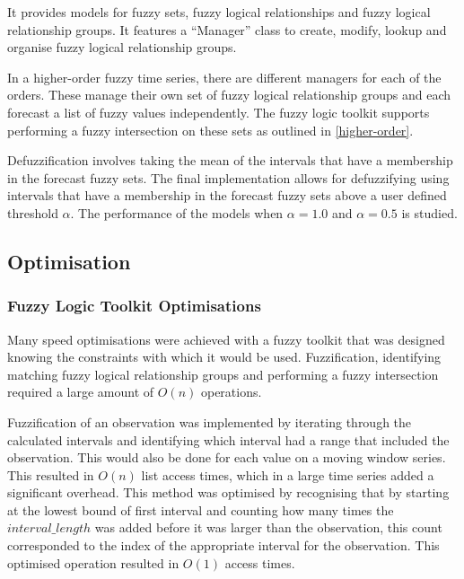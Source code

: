 \documentclass[12pt]{article}
\theoremstyle{definition}
\begin{document}
It provides models for fuzzy sets, fuzzy logical relationships and fuzzy logical relationship groups. It features a ``Manager'' class to create, modify, lookup and organise fuzzy logical relationship groups.

In a higher-order fuzzy time series, there are different managers for each of the orders. These manage their own set of fuzzy logical relationship groups and each forecast a list of fuzzy values independently. The fuzzy logic toolkit supports performing a fuzzy intersection on these sets as outlined in \cref{higher-order}.

Defuzzification involves taking the mean of the intervals that have a membership in the forecast fuzzy sets. The final implementation allows for defuzzifying using intervals that have a membership in the forecast fuzzy sets above a user defined threshold $\alpha$. The performance of the models when $\alpha = 1.0$ and $\alpha = 0.5$ is studied.

\subsection{Optimisation}

\label{optimisations}

\subsubsection{Fuzzy Logic Toolkit Optimisations}

Many speed optimisations were achieved with a fuzzy toolkit that was designed knowing the constraints with which it would be used. Fuzzification, identifying matching fuzzy logical relationship groups and performing a fuzzy intersection required a large amount of $O(n)$ operations. 

Fuzzification of an observation was implemented by iterating through the calculated intervals and identifying which interval had a range that included the observation. This would also be done for each value on a moving window series. This resulted in $O(n)$ list access times, which in a large time series added a significant overhead. This method was optimised by recognising that by starting at the lowest bound of first interval and counting how many times the $interval\_length$ was added before it was larger than the observation, this count corresponded to the index of the appropriate interval for the observation. This optimised operation resulted in $O(1)$ access times.
\end{document}
